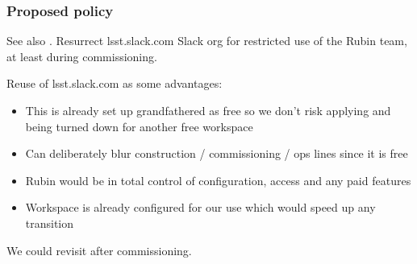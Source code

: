 \subsubsection{Proposed policy}
See also .
Resurrect lsst.slack.com Slack org for restricted use of the Rubin team, at least during commissioning.

Reuse of lsst.slack.com as some advantages:

\begin{itemize}
\item  This is already set up grandfathered as free so we don’t risk applying and being turned down for another free workspace
\item  Can deliberately blur construction / commissioning / ops lines since it is free
\item  Rubin would be in total control of configuration, access and any paid features
\item  Workspace is already configured for our use which would speed up any transition

\end{itemize}
We could revisit after commissioning.
